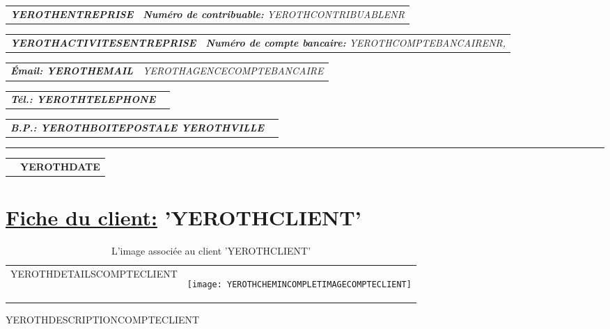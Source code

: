 \documentclass[11pt, YEROTHPAPERSPEC]{article} %
\makeatletter
\newcommand{\headerrow}[2]
{\begin{tabular*}{\linewidth}{l@{\extracolsep{\fill}}r}
	#1 &
	#2 \\
\end{tabular*}}
\newcommand{\emphbold}[1]{\textbf{\emph{#1}}\xspace}
\makeatother
\begin{document}
\bigskip

\headerrow
	{\emphbold{YEROTHENTREPRISE}}
	{\emph{\textbf{Num\'ero de contribuable:} YEROTHCONTRIBUABLENR}}
\headerrow
	{\emphbold{YEROTHACTIVITESENTREPRISE}}
	{\emph{\textbf{Num\'ero de compte bancaire:} YEROTHCOMPTEBANCAIRENR,}}
\headerrow
	{\emphbold{\'Email: YEROTHEMAIL}}
	{\emph{YEROTHAGENCECOMPTEBANCAIRE}}
\headerrow
	{\emphbold{T\'el.: YEROTHTELEPHONE}}
	{}
\headerrow
	{\emphbold{B.P.: YEROTHBOITEPOSTALE YEROTHVILLE}}
	{}
	
\hrule

\headerrow
	{}
	{\textbf{YEROTHDATE}}

\vspace*{0.9cm}


\section*{\underline{Fiche du client:} 'YEROTHCLIENT'}


\vspace{0.3cm} 

\begin{table}[!htbp]
\begin{tabular}{ll}
\parbox{27em}{
YEROTHDETAILSCOMPTECLIENT
}

&

\parbox{15em}{
\begin{center}
\texttt{[image: YEROTHCHEMINCOMPLETIMAGECOMPTECLIENT]}
\caption*{L'image associ\'ee au client 'YEROTHCLIENT'}
\end{center}
}
\end{tabular}
\end{table}

\vspace{0.3cm}

YEROTHDESCRIPTIONCOMPTECLIENT
\end{document}
